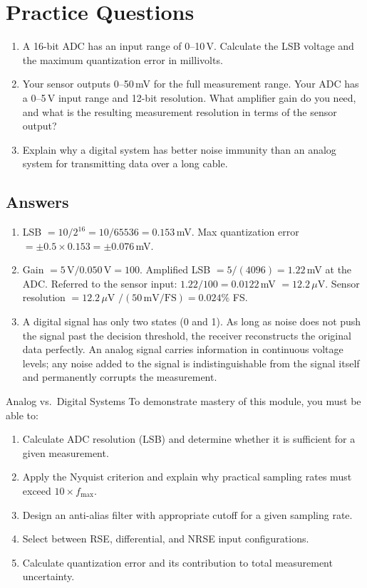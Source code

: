 \documentclass[11pt,letterpaper,twoside,openany]{book}
\begin{document}
\section{Practice Questions}
\begin{enumerate}[leftmargin=1.5em]
\item A 16-bit ADC has an input range of 0--10\,V. Calculate the LSB voltage and the maximum quantization error in millivolts.
\item Your sensor outputs 0--50\,mV for the full measurement range. Your ADC has a 0--5\,V input range and 12-bit resolution. What amplifier gain do you need, and what is the resulting measurement resolution in terms of the sensor output?
\item Explain why a digital system has better noise immunity than an analog system for transmitting data over a long cable.
\end{enumerate}

\subsection{Answers}
\begin{enumerate}[leftmargin=1.5em]
\item LSB $= 10 / 2^{16} = 10/65536 = 0.153$\,mV. Max quantization error $= \pm 0.5 \times 0.153 = \pm 0.076$\,mV.
\item Gain $= 5\,\text{V} / 0.050\,\text{V} = 100$. Amplified LSB $= 5/(4096) = 1.22$\,mV at the ADC. Referred to the sensor input: $1.22/100 = 0.0122$\,mV $= 12.2$\,$\mu$V. Sensor resolution $= 12.2\,\mu$V $/ (50\,\text{mV}/\text{FS}) = 0.024\%$ FS.
\item A digital signal has only two states (0 and 1). As long as noise does not push the signal past the decision threshold, the receiver reconstructs the original data perfectly. An analog signal carries information in continuous voltage levels; any noise added to the signal is indistinguishable from the signal itself and permanently corrupts the measurement.
\end{enumerate}



\begin{masterycheckbox}{Analog vs.\ Digital Systems}
To demonstrate mastery of this module, you must be able to:
\begin{enumerate}[nosep,leftmargin=1.5em]
\item Calculate ADC resolution (LSB) and determine whether it is sufficient for a given measurement.
\item Apply the Nyquist criterion and explain why practical sampling rates must exceed $10\times f_{\max}$.
\item Design an anti-alias filter with appropriate cutoff for a given sampling rate.
\item Select between RSE, differential, and NRSE input configurations.
\item Calculate quantization error and its contribution to total measurement uncertainty.
\end{enumerate}
\end{masterycheckbox}
\end{document}
